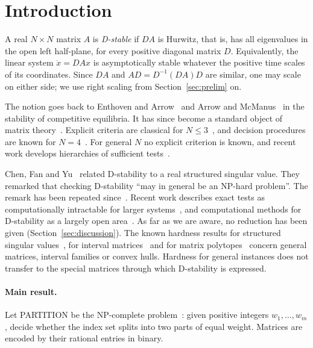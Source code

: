 \documentclass[11pt,a4paper]{article}
\theoremstyle{plain}
\theoremstyle{definition}
\theoremstyle{remark}
\begin{document}
\tableofcontents

\section{Introduction}\label{sec:intro}

A real $N\times N$ matrix $A$ is \emph{D-stable} if $DA$ is Hurwitz, that is, has all
eigenvalues in the open left half-plane, for every positive diagonal matrix $D$.
Equivalently, the linear system $\dot x=DAx$ is asymptotically stable whatever the
positive time scales of its coordinates. Since $DA$ and $AD=D^{-1}(DA)D$ are similar,
one may scale on either side; we use right scaling from Section~\ref{sec:prelim} on.

The notion goes back to Enthoven and Arrow~\cite{enthoven1956} and Arrow and
McManus~\cite{arrow1958} in the stability of competitive equilibria. It has since
become a standard object of matrix
theory~\cite{johnson1974,cross1978,hershkowitz1992,logofet1993,hornjohnson1991,kushel2019}.
Explicit criteria are classical for $N\le3$~\cite{cain1976}, and decision procedures
are known for $N=4$~\cite{kanovei1998,impram2005}. For general $N$ no explicit
criterion is known, and recent work develops hierarchies of sufficient
tests~\cite{kushel2019,kushel2026}.

Chen, Fan and Yu~\cite{chen1995} related D-stability to a real structured singular
value. They remarked that checking D-stability ``may in general be an NP-hard
problem''. The remark has been repeated since~\cite{giorgi2015}. Recent work describes
exact tests as computationally intractable for larger systems~\cite{kushel2026}, and
computational methods for D-stability as a largely open area~\cite{casasanta2026}. As
far as we are aware, no reduction has been given (Section~\ref{sec:discussion}).
The known hardness results for structured singular values~\cite{braatz1994}, for
interval matrices~\cite{poljak1993,nemirovskii1993} and for matrix
polytopes~\cite{gurvits2009} concern general matrices, interval families or convex
hulls. Hardness for general instances does not transfer to the special
matrices through which D-stability is expressed.

\paragraph{Main result.}
Let PARTITION be the NP-complete problem~\cite{karp1972,garey1979}: given
positive integers $w_1,\dots,w_m$, decide whether the index set splits into two parts
of equal weight. Matrices are encoded by their rational entries in binary.
\end{document}
